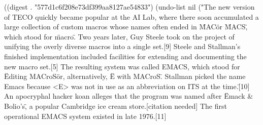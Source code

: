 
((digest . "577d1c6f208e73df399aa8127ae54833") (undo-list nil ("The new version of TECO quickly became popular at the AI Lab, where there soon accumulated a large collection of custom macros whose names often ended in \"MAC\" or \"MACS\", which stood for \"macro\". Two years later, Guy Steele took on the project of unifying the overly diverse macros into a single set.[9] Steele and Stallman's finished implementation included facilities for extending and documenting the new macro set.[5] The resulting system was called EMACS, which stood for \"Editing MACroS\" or, alternatively, \"E with MACroS\". Stallman picked the name Emacs \"because <E> was not in use as an abbreviation on ITS at the time.\"[10] An apocryphal hacker koan alleges that the program was named after \"Emack & Bolio's\", a popular Cambridge ice cream store.[citation needed] The first operational EMACS system existed in late 1976.[11]

